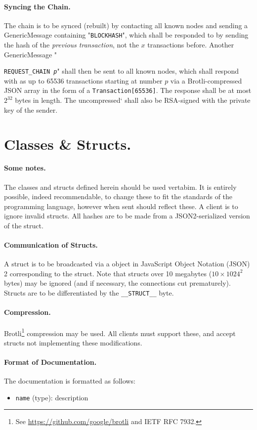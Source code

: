\documentclass{article}
\begin{document}
\paragraph{Syncing the Chain.} The chain is to be synced (rebuilt) by
contacting all known nodes and sending a GenericMessage containing
"{\texttt{BLOCKHASH}}", which shall be responded to by sending the hash of the
{\it{previous transaction}}, not the $x$ transactions before. Another
GenericMessage "{\texttt{REQUEST\_CHAIN {\it{p}}}" shall then be sent to
all known nodes, which shall respond with as up to
65536 transactions starting at number $p$ via a Brotli-compressed JSON array in
the form of a \verb|Transaction[65536]|. The response shall be at most
$2^{32}$ bytes in length. The uncompressed` shall also be RSA-signed with the
private key of the sender.

\section{Classes \& Structs.}
\paragraph{Some notes.} The classes and structs defined herein should be used
vertabim. It is entirely possible, indeed recommendable, to change these to fit
the standards of the programming language, however when sent should reflect
these. A client is to ignore invalid structs. All hashes are to be made from
a JSON2-serialized version of the struct.

\paragraph{Communication of Structs.} A struct is to be broadcasted via a
object in JavaScript Object Notation (JSON) 2 corresponding to the struct.
Note that structs over 10 megabytes ($10 \times 1024^2$ bytes) may be ignored
(and if necessary, the connections cut prematurely). Structs are to be
differentiated by the \verb|__STRUCT__|  byte.

\paragraph{Compression.} Brotli\footnote{See
\url{https://github.com/google/brotli} and IETF RFC 7932.} compression may be
used. All clients must support these, and accept structs not implementing these
modifications.

\paragraph{Format of Documentation.} The documentation is formatted as follows:
\begin{itemize}
	\item \verb|name| (type): description
\end{itemize}

}
\end{document}
